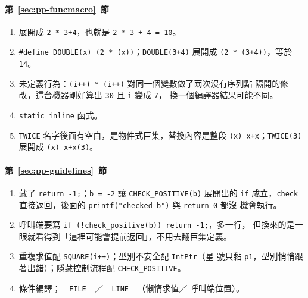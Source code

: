 \paragraph{第~\ref{sec:pp-funcmacro}~節}
\begin{enumerate}
\item 展開成 \texttt{2 * 3+4}，也就是 \texttt{2 * 3 + 4 = 10}。
\item \texttt{\#define DOUBLE(x) (2 * (x))}；\texttt{DOUBLE(3+4)} 展開成
\texttt{(2 * (3+4))}，等於 \texttt{14}。
\item 未定義行為：\texttt{(i++) * (i++)} 對同一個變數做了兩次沒有序列點
隔開的修改，這台機器剛好算出 \texttt{30} 且 \texttt{i} 變成 \texttt{7}，
換一個編譯器結果可能不同。
\item \texttt{static inline} 函式。
\item \texttt{TWICE} 名字後面有空白，是物件式巨集，替換內容是整段
\texttt{(x) x+x}；\texttt{TWICE(3)} 展開成 \texttt{(x) x+x(3)}。
\end{enumerate}

\paragraph{第~\ref{sec:pp-guidelines}~節}
\begin{enumerate}
\item 藏了 \texttt{return -1;}；\texttt{b = -2} 讓
\texttt{CHECK\_POSITIVE(b)} 展開出的 \texttt{if} 成立，\texttt{check}
直接返回，後面的 \texttt{printf("checked b")} 與 \texttt{return 0} 都沒
機會執行。
\item 呼叫端要寫 \texttt{if (!check\_positive(b)) return -1;}，多一行，
但換來的是一眼就看得到「這裡可能會提前返回」，不用去翻巨集定義。
\item 重複求值配 \texttt{SQUARE(i++)}；型別不安全配 \texttt{IntPtr}（星
號只黏 \texttt{p1}，型別悄悄跟著出錯）；隱藏控制流程配
\texttt{CHECK\_POSITIVE}。
\item 條件編譯；\texttt{\_\_FILE\_\_}／\texttt{\_\_LINE\_\_}（懶惰求值／
呼叫端位置）。
\end{enumerate}


